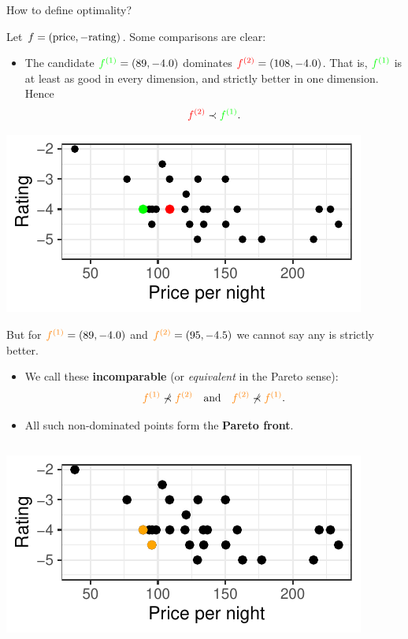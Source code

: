 \documentclass[11pt,compress,t,notes=noshow,xcolor=table]{beamer}
\begin{document}
\begin{vbframe}{How to define optimality?}

Let \(f = (\text{price}, -\text{rating})\). Some comparisons are clear:

\bigskip
\begin{itemize}
  \item The candidate 
        \(\textcolor{green}{f^{(1)}}=(89,-4.0)\)
        dominates 
        \(\textcolor{red}{f^{(2)}}=(108,-4.0)\). 
        That is, \(\textcolor{green}{f^{(1)}}\) is at least as good 
        in every dimension, and strictly better in one dimension.
        Hence 
\[
\textcolor{red}{f^{(2)}} \prec \textcolor{green}{f^{(1)}}.
\]
\end{itemize}

\begin{center}
\includegraphics[width=0.5\linewidth]{slides/11-multicrit/figure_man/expedia-3-1.pdf}
\end{center}



{\small
But for
\(\textcolor{orange}{f^{(1)}}=(89,-4.0)\) 
and 
\(\textcolor{orange}{f^{(2)}}=(95,-4.5)\)
we cannot say any is strictly better.}

\framebreak

\begin{itemize}\setlength{\itemsep}{0.1em}
  \item We call these \textbf{incomparable} (or \emph{equivalent} in the Pareto sense):
\[
\textcolor{orange}{f^{(1)}} 
   \not\prec 
\textcolor{orange}{f^{(2)}} 
\quad\text{and}\quad
\textcolor{orange}{f^{(2)}} 
   \not\prec 
\textcolor{orange}{f^{(1)}}.
\]
\item All such non-dominated points form the \textbf{Pareto front}.
\end{itemize}

\bigskip
\begin{columns}[c]
        \includegraphics[width=\textwidth]{slides/11-multicrit/figure_man/expedia-4-1.pdf}
        

\end{columns}
\end{vbframe}
\end{document}
